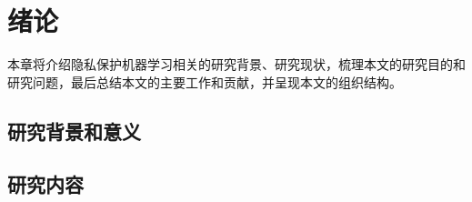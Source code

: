 \chapter{绪论}
本章将介绍隐私保护机器学习相关的研究背景、研究现状，梳理本文的研究目的和研究问题，最后总结本文的主要工作和贡献，并呈现本文的组织结构。
\section{研究背景和意义}


\section{研究内容}




